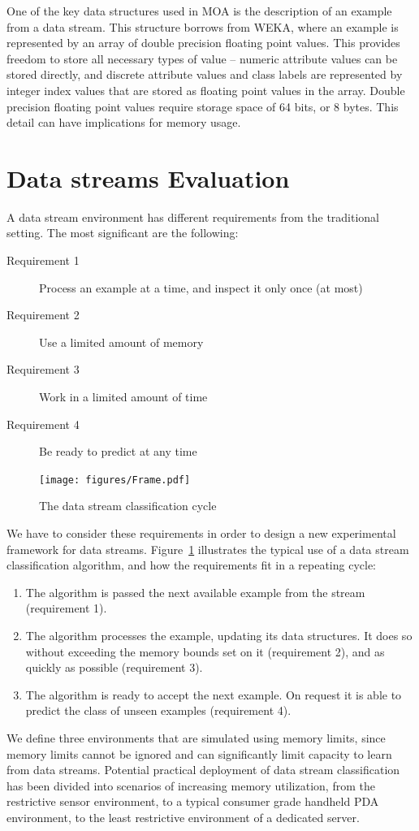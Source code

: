 \documentclass[a4paper,12pt,twoside]{book}
\begin{document}
    One of the key data structures used in MOA is the description of an example
from a data stream. This structure borrows from WEKA, where an example is
represented by an array of double precision floating point values. This provides
freedom to store all necessary types of value \--- numeric attribute values can be
stored directly, and discrete attribute values and class labels are represented
by integer index values that are stored as floating point values in the array.
Double precision floating point values require storage space of 64 bits, or 8
bytes. This detail can have implications for memory usage. %

\section{Data streams Evaluation}
A data stream environment has different requirements from the traditional 
setting. The most significant are the following: 
\begin{description}
\item[Requirement 1] Process an example at a time, and inspect
 it only once (at most)
\item[Requirement 2] Use a limited amount of memory
\item[Requirement 3] Work in a limited amount of time
\item[Requirement 4] Be ready to predict at any time
\end{description}
\begin{figure}[t]
\begin{center} 
\texttt{[image: figures/Frame.pdf]}
\end{center} 
\caption{The data stream classification cycle}
\label{fig:cycle}
\end{figure} 
We have to consider these requirements in order to design a new experimental
framework for data streams.
Figure~\ref{fig:cycle} illustrates the typical use of a data stream 
classification algorithm, and how the requirements fit
in a repeating cycle:
\begin{enumerate}
\item  The algorithm is passed the next available example from the stream
   (requirement 1).
\item  The algorithm processes the example, updating its data structures. It
   does so without exceeding the memory bounds set on it (requirement 2),
   and as quickly as possible (requirement 3).
\item  The algorithm is ready to accept the next example. On request it is
   able to predict the class of unseen examples
   (requirement 4).
\end{enumerate}
\BEGINOMIT
We define three environments that are simulated using memory limits, 
since memory limits cannot be ignored and can significantly limit capacity
to learn from data streams. Potential practical deployment of data stream
classification has been divided into scenarios of increasing memory utilization,
from the restrictive sensor environment, to a typical consumer grade handheld
PDA environment, to the least restrictive environment of a dedicated server.
\end{document}
